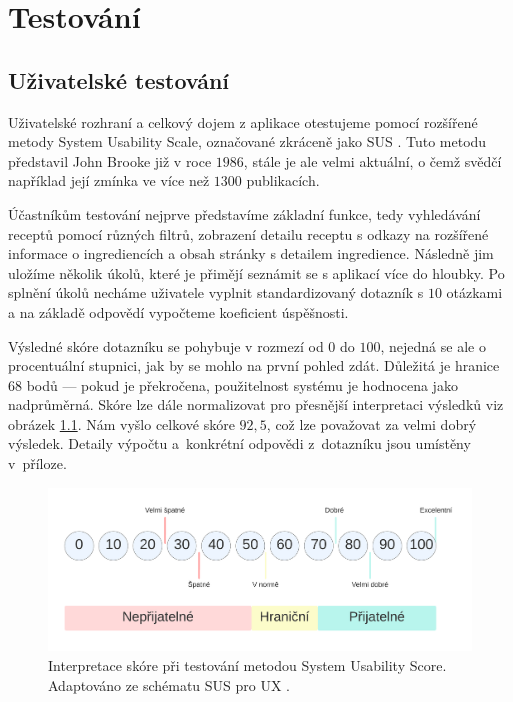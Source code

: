 
\chapter{Testování}

\section{Uživatelské testování}

Uživatelské rozhraní a celkový dojem z aplikace otestujeme pomocí rozšířené metody System Usability Scale, označované zkráceně jako SUS \citep{sus-test}. Tuto metodu představil John Brooke již v roce $1986$, stále je ale velmi aktuální, o čemž svědčí například její zmínka ve více než $1300$ publikacích.

Účastníkům testování nejprve představíme základní funkce, tedy vyhledávání receptů pomocí různých filtrů, zobrazení detailu receptu s odkazy na rozšířené informace o ingrediencích a obsah stránky s detailem ingredience. Následně jim uložíme několik úkolů, které je přimějí seznámit se s aplikací více do hloubky. Po splnění úkolů necháme uživatele vyplnit standardizovaný dotazník s $10$ otázkami a na základě odpovědí vypočteme koeficient úspěšnosti.

Výsledné skóre dotazníku se pohybuje v rozmezí od $0$ do $100$, nejedná se ale o procentuální stupnici, jak by se mohlo na první pohled zdát. Důležitá je hranice $68$ bodů --- pokud je překročena, použitelnost systému je hodnocena jako nadprůměrná. Skóre lze dále normalizovat pro přesnější interpretaci výsledků viz obrázek \ref{obr04:sus-score-system}. Nám vyšlo celkové skóre $92,5$, což lze považovat za velmi dobrý výsledek. Detaily výpočtu a~konkrétní odpovědi z~dotazníku jsou umístěny v~příloze.

\begin{figure}[h!]\centering
\includegraphics[width=140mm]{../img/sus-score-system}
\caption{Interpretace skóre při testování metodou System Usability Score. Adaptováno ze schématu SUS pro UX \citep{sus-adobe}.}
\label{obr04:sus-score-system}
\end{figure}

